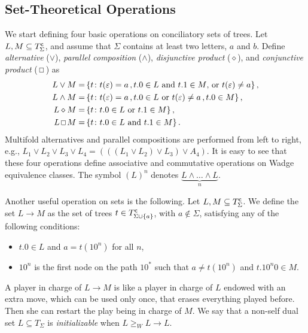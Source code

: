 \documentclass{llncs}
\newcommand {\mybox}{\textrm{{\scriptsize $\,\Box\,$}}}
\begin{document}
\subsection{Set-Theoretical Operations}

We start defining four basic operations on conciliatory sets of trees. Let $L, M \subseteq T^{\sf c}_\Sigma$, and assume that $\Sigma$ contains at least two letters, $a$ and $b$. Define
{\em alternative} ($\lor$), {\em parallel composition}  ($\land$), {\em disjunctive product} ($\diamond$), and {\em
conjunctive product} ($\mybox$) as
\begin{align*}
L \lor M = \,&\{t\colon t(\varepsilon) = a\,, t.0 \in L \text{ and } t.1 \in M \textrm{, or } t(\varepsilon) \neq a\}\,,\\
L \land M = \,&\{t\colon t(\varepsilon) = a\,, t.0 \in L \textrm{ or } t(\varepsilon) \neq a\,, t.0 \in M\}\,,\\
L \diamond M =\, &\{t\colon  t.0 \in L \textrm{ or } t.1 \in M\}\,,\\
L \mybox M =\, &\{t\colon t.0 \in L \textrm{ and } t.1 \in M\}\,.
\end{align*}
Multifold alternatives and parallel compositions are performed from left to right, e.g.,  $L_1 \lor L_2 \lor L_3 \lor L_4 = (((L_1 \lor L_2) \lor L_3) \lor A_4 )$. It is easy to see that these four operations define associative and commutative operations on Wadge equivalence classes. The symbol $(L)^n$ denotes $\underbrace{L \land \ldots \land L}_{n}$.\label{automatapower}



Another useful operation on sets is the following. Let $L, M \subseteq T^{\sf c}_\Sigma$. We define
 the set $L \to M$ as the set of trees $t \in T^{\sf c}_{\Sigma\cup \{a\}}$, with $a \notin \Sigma$, satisfying any of the following conditions:

\begin{itemize}
\item $t.0 \in L$ and $a = t(10^n)$ for all $n$,
\item $10^{n}$ is the first node on the path $10^*$ such that $a \neq t(10^{n})$ and $t.10^{n}0 \in M$.
\end{itemize}
A player in charge of $L \to M$ is like a player in charge of $L$ endowed with an extra move, which can be used only once, that erases everything played before. Then she can restart the play being in charge of $M$.  We say that  a non-self dual set $L\subseteq T_\Sigma$ is \emph{initializable} when $L \geq_W L \to L$.
\end{document}
